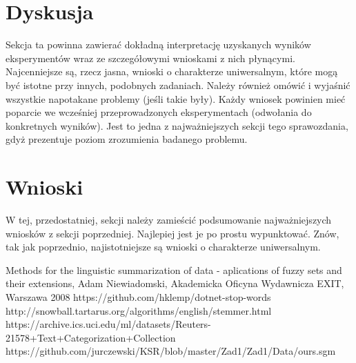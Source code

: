 \documentclass{classrep}
\begin{document}
\section{Dyskusja}



{\color{blue}
Sekcja ta powinna zawierać dokładną interpretację uzyskanych wyników
eksperymentów wraz ze szczegółowymi wnioskami z nich płynącymi. Najcenniejsze
są, rzecz jasna, wnioski o charakterze uniwersalnym, które mogą być istotne
przy innych, podobnych zadaniach. Należy również omówić i wyjaśnić wszystkie
napotakane problemy (jeśli takie były). Każdy wniosek powinien mieć poparcie
we wcześniej przeprowadzonych eksperymentach (odwołania do konkretnych
wyników). Jest to jedna z najważniejszych sekcji tego sprawozdania, gdyż
prezentuje poziom zrozumienia badanego problemu.}
\section{Wnioski}
{\color{blue}W tej, przedostatniej, sekcji należy zamieścić podsumowanie
najważniejszych wniosków z sekcji poprzedniej. Najlepiej jest je po prostu
wypunktować. Znów, tak jak poprzednio, najistotniejsze są wnioski o
charakterze uniwersalnym.}


\begin{thebibliography}{}
Methods for the linguistic summarization of data - aplications of fuzzy sets and their extensions, Adam Niewiadomski, Akademicka Oficyna Wydawnicza EXIT, Warszawa 2008
https://github.com/hklemp/dotnet-stop-words
http://snowball.tartarus.org/algorithms/english/stemmer.html
https://archive.ics.uci.edu/ml/datasets/Reuters-21578+Text+Categorization+Collection
https://github.com/jurczewski/KSR/blob/master/Zad1/Zad1/Data/ours.sgm
\end{thebibliography}
\end{document}
